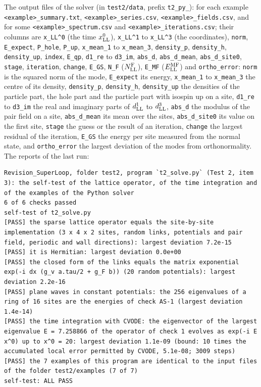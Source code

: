 \documentclass[
  10pt,
]{article}
\begin{document}
The output files of the solver (in \texttt{test2/data}, prefix
\texttt{t2\_py\_}): for each example
\texttt{\textless{}example\textgreater{}\_summary.txt},
\texttt{\textless{}example\textgreater{}\_series.csv},
\texttt{\textless{}example\textgreater{}\_fields.csv}, and for some
\texttt{\textless{}example\textgreater{}\_spectrum.csv} and
\texttt{\textless{}example\textgreater{}\_iterations.csv}; their columns
are \texttt{x\_LL\^{}0} (the time \(x^0_{\rm LL}\)), \texttt{x\_LL\^{}1}
to \texttt{x\_LL\^{}3} (the coordinates), \texttt{norm},
\texttt{E\_expect}, \texttt{P\_hole}, \texttt{P\_up},
\texttt{x\_mean\_1} to \texttt{x\_mean\_3}, \texttt{density\_p},
\texttt{density\_h}, \texttt{density\_up}, \texttt{index},
\texttt{E\_qp}, \texttt{d1\_re} to \texttt{d3\_im}, \texttt{abs\_d},
\texttt{abs\_d\_mean}, \texttt{abs\_d\_site0}, \texttt{stage},
\texttt{iteration}, \texttt{change}, \texttt{E\_GS}, \texttt{N\_F}
(\(N^{\rm F}_{\rm LL}\)), \texttt{E\_MF} (\(E^{\rm MF}_{\rm LL}\)) and
\texttt{ortho\_error}: \texttt{norm} is the squared norm of the mode,
\texttt{E\_expect} its energy, \texttt{x\_mean\_1} to
\texttt{x\_mean\_3} the centre of its density, \texttt{density\_p},
\texttt{density\_h}, \texttt{density\_up} the densities of the particle
part, the hole part and the particle part with isospin up on a site,
\texttt{d1\_re} to \texttt{d3\_im} the real and imaginary parts of
\(d^1_{\rm LL}\) to \(d^3_{\rm LL}\), \texttt{abs\_d} the modulus of the
pair field on a site, \texttt{abs\_d\_mean} its mean over the sites,
\texttt{abs\_d\_site0} its value on the first site, \texttt{stage} the
guess or the result of an iteration, \texttt{change} the largest
residual of the iteration, \texttt{E\_GS} the energy per site measured
from the normal state, and \texttt{ortho\_error} the largest deviation
of the modes from orthonormality. The reports of the last run:

\begin{verbatim}
Revision_SuperLoop, folder test2, program `t2_solve.py` (Test 2, item 3): the self-test of the lattice operator, of the time integration and of the examples of the Python solver
6 of 6 checks passed
self-test of t2_solve.py
[PASS] the sparse lattice operator equals the site-by-site implementation (3 x 4 x 2 sites, random links, potentials and pair field, periodic and wall directions): largest deviation 7.2e-15
[PASS] it is Hermitian: largest deviation 0.0e+00
[PASS] the closed form of the links equals the matrix exponential exp(-i dx (g_v a.tau/2 + g_F b)) (20 random potentials): largest deviation 2.2e-16
[PASS] plane waves in constant potentials: the 256 eigenvalues of a ring of 16 sites are the energies of check AS-1 (largest deviation 1.4e-14)
[PASS] the time integration with CVODE: the eigenvector of the largest eigenvalue E = 7.258866 of the operator of check 1 evolves as exp(-i E x^0) up to x^0 = 20: largest deviation 1.1e-09 (bound: 10 times the accumulated local error permitted by CVODE, 5.1e-08; 3009 steps)
[PASS] the 7 examples of this program are identical to the input files of the folder test2/examples (7 of 7)
self-test: ALL PASS
\end{verbatim}
\end{document}
